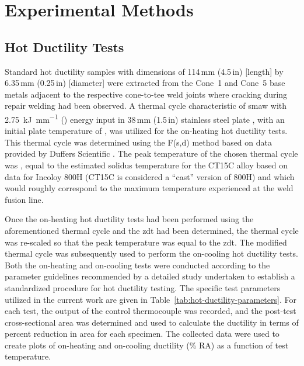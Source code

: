 \chapter{Experimental Methods} \label{ch:experimental-methods}

\section{Hot Ductility Tests}
Standard hot ductility samples with dimensions of 114\,mm (4.5\,in) [length] by 6.35\,mm (0.25\,in) [diameter] were extracted from the Cone~1 and Cone~5 base metals adjacent to the respective cone-to-tee weld joints where cracking during repair welding had been observed.  A thermal cycle characteristic of \gls{smaw} with \SI[round-mode=places,round-precision=2]{2.75}{\kilo\joule\per\milli\meter} () energy input in 38\,mm (1.5\,in) stainless steel plate \cite{nippes_heat-affected_1955}, with an initial plate temperature of , was utilized for the on-heating hot ductility tests.  This thermal cycle was determined using the F(s,d) method \cite{nippes_cooling_1949} based on data provided by Duffers Scientific \cite{duffers_haz_1989}. The peak temperature of the chosen thermal cycle was , equal to the estimated solidus temperature for the CT15C alloy based on data for Incoloy 800H (CT15C is considered a ``cast'' version of 800H) and which would roughly correspond to the maximum temperature experienced at the weld fusion line.

Once the on-heating hot ductility tests had been performed using the aforementioned thermal cycle and the \gls{zdt} had been determined, the thermal cycle was re-scaled so that the peak temperature was equal to the \gls{zdt}. The modified thermal cycle was subsequently used to perform the on-cooling hot ductility tests.  Both the on-heating and on-cooling tests were conducted according to the parameter guidelines recommended by a detailed study \cite{lundin_standardization_1990_experiment} undertaken to establish a standardized procedure for hot ductility testing.  The specific test parameters utilized in the current work are given in Table~\ref{tab:hot-ductility-parameters}.  For each test, the output of the control thermocouple was recorded, and the post-test cross-sectional area was determined and used to calculate the ductility in terms of percent reduction in area for each specimen.  The collected data were used to create plots of on-heating and on-cooling ductility (\% RA) as a function of test temperature.

